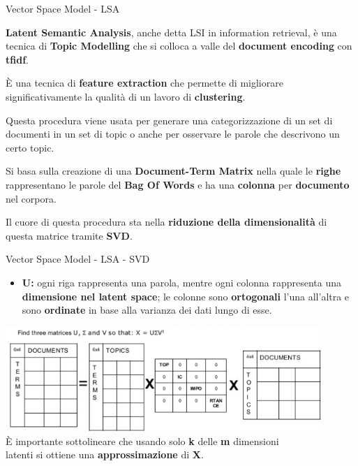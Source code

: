 \documentclass[british]{beamer}
\begin{document}
\begin{frame}{Vector Space Model - LSA}
	
	\textbf{Latent Semantic Analysis}, anche detta LSI in information retrieval, \`{e} una tecnica di \textbf{Topic Modelling} che si colloca a valle del \textbf{document encoding} con \textbf{tfidf}. 
	
	\`{E} una tecnica di \textbf{feature extraction} che permette di migliorare significativamente la qualit\`{a} di un lavoro di \textbf{clustering}.
	
	Questa procedura viene usata per generare una categorizzazione di un \alert{set di documenti} in un \alert{set di topic} o anche per osservare le parole che descrivono un certo topic.
	
	Si basa sulla creazione di una \textbf{Document-Term Matrix} nella quale le \textbf{righe} rappresentano le parole del \textbf{Bag Of Words} e ha una \textbf{colonna} per \textbf{documento} nel corpora.
	
	Il cuore di questa procedura sta nella \textbf{riduzione della dimensionalit\`{a}} di questa matrice tramite \textbf{SVD}.
	
\end{frame}

\begin{frame}{Vector Space Model - LSA - SVD}
	\begin{itemize}
		\item \textbf{U: }ogni riga rappresenta una parola, mentre ogni colonna rappresenta una \textbf{dimensione nel latent space}; le colonne sono \textbf{ortogonali} l'una all'altra e sono \textbf{ordinate} in base alla varianza dei dati lungo di esse.
	\end{itemize}
	\includegraphics[width=0.9\textwidth,
	 height=0.4\textheight]{./Imgs/LSA1}\\
	 \`{E} importante sottolineare che usando solo \textbf{k} delle \textbf{m} dimensioni\\ latenti si ottiene una \textbf{approssimazione} di \textbf{X}.
\end{frame}
\end{document}
